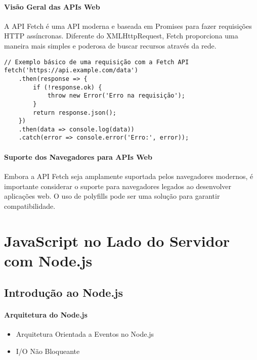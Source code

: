 \subsubsection{Visão Geral das APIs Web}
A API Fetch é uma API moderna e baseada em Promises para fazer requisições HTTP assíncronas. Diferente do XMLHttpRequest, Fetch proporciona uma maneira mais simples e poderosa de buscar recursos através da rede.

\begin{verbatim}
// Exemplo básico de uma requisição com a Fetch API
fetch('https://api.example.com/data')
    .then(response => {
        if (!response.ok) {
            throw new Error('Erro na requisição');
        }
        return response.json();
    })
    .then(data => console.log(data))
    .catch(error => console.error('Erro:', error));
\end{verbatim}

\subsubsection{Suporte dos Navegadores para APIs Web}
Embora a API Fetch seja amplamente suportada pelos navegadores modernos, é importante considerar o suporte para navegadores legados ao desenvolver aplicações web. O uso de polyfills pode ser uma solução para garantir compatibilidade.



















\chapter{JavaScript no Lado do Servidor com Node.js}

\section{Introdução ao Node.js}
\subsubsection{Arquitetura do Node.js}
\begin{itemize}
\item Arquitetura Orientada a Eventos no Node.js
\item I/O Não Bloqueante
\end{itemize}
